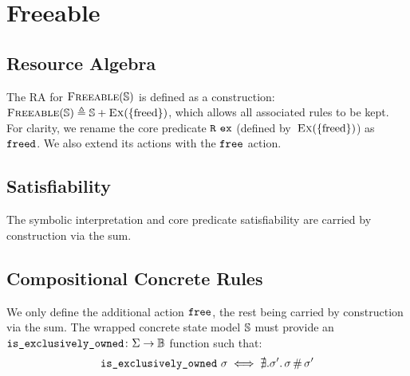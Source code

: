 

\section{Freeable} \label{rules:freeable}

\subsection{Resource Algebra}

The RA for $\textsc{Freeable}(\mathbb S)$ is defined as a construction: $\textsc{Freeable}(\mathbb S) \triangleq \mathbb S + \textsc{Ex}(\{\text{freed}\})$, which allows all associated rules to be kept. For clarity, we rename the core predicate $\texttt{R}~\texttt{ex}$ (defined by~$\textsc{Ex}(\{\text{freed}\})$) as $\texttt{freed}$. We also extend its actions with the $\texttt{free}$ action.

\subsection{Satisfiability}

The symbolic interpretation and core predicate satisfiability are carried by construction via the sum.

\subsection{Compositional Concrete Rules}

We only define the additional action $\texttt{free}$, the rest being carried by construction via the sum. The wrapped concrete state model $\mathbb S$ must provide an ${\texttt{is\_exclusively\_owned}\colon\Sigma\rightarrow\mathbb{B}}$ function such that: \begin{align*}
	\texttt{is\_exclusively\_owned}~\sigma \iff \nexists. \sigma'\ldotp \sigma\operatorname{\#}\sigma'
\end{align*}

